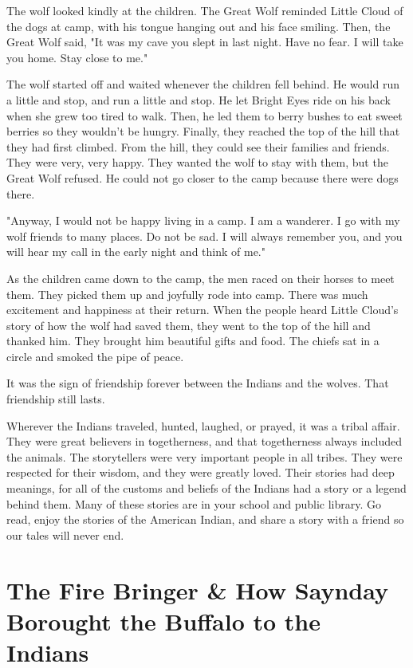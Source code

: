 The wolf looked kindly at the children. The Great Wolf reminded Little Cloud of the dogs at camp, with his tongue hanging out and his face smiling. Then, the Great Wolf said, "It was my cave you slept in last night. Have no fear. I will take you home. Stay close to me."

The wolf started off and waited whenever the children fell behind. He would run a little and stop, and run a little and stop. He let Bright Eyes ride on his back when she grew too tired to walk. Then, he led them to berry bushes to eat sweet berries so they wouldn't be hungry. Finally, they reached the top of the hill that they had first climbed. From the hill, they could see their families and friends. They were very, very happy. They wanted the wolf to stay with them, but the Great Wolf refused. He could not go closer to the camp because there were dogs there.

"Anyway, I would not be happy living in a camp. I am a wanderer. I go with my wolf friends to many places. Do not be sad. I will always remember you, and you will hear my call in the early night and think of me."

As the children came down to the camp, the men raced on their horses to meet them. They picked them up and joyfully rode into camp. There was much excitement and happiness at their return. When the people heard Little Cloud's story of how the wolf had saved them, they went to the top of the hill and thanked him. They brought him beautiful gifts and food. The chiefs sat in a circle and smoked the pipe of peace.

It was the sign of friendship forever between the Indians and the wolves. That friendship still lasts.

Wherever the Indians traveled, hunted, laughed, or prayed, it was a tribal affair. They were great believers in togetherness, and that togetherness always included the animals. The storytellers were very important people in all tribes. They were respected for their wisdom, and they were greatly loved. Their stories had deep meanings, for all of the customs and beliefs of the Indians had a story or a legend behind them. Many of these stories are in your school and public library. Go read, enjoy the stories of the American Indian, and share a story with a friend so our tales will never end.

\section{The Fire Bringer \& How Saynday Borought the Buffalo to the Indians}

